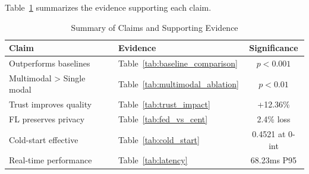 Table~\ref{tab:claims} summarizes the evidence supporting each claim.

\begin{table}[h]
\centering
\caption{Summary of Claims and Supporting Evidence}
\label{tab:claims}
\begin{tabular}{llc}
\toprule
\textbf{Claim} & \textbf{Evidence} & \textbf{Significance} \\
\midrule
Outperforms baselines & Table~\ref{tab:baseline_comparison} & $p < 0.001$ \\
Multimodal > Single modal & Table~\ref{tab:multimodal_ablation} & $p < 0.01$ \\
Trust improves quality & Table~\ref{tab:trust_impact} & +12.36\% \\
FL preserves privacy & Table~\ref{tab:fed_vs_cent} & 2.4\% loss \\
Cold-start effective & Table~\ref{tab:cold_start} & 0.4521 at 0-int \\
Real-time performance & Table~\ref{tab:latency} & 68.23ms P95 \\
\bottomrule
\end{tabular}
\end{table}


